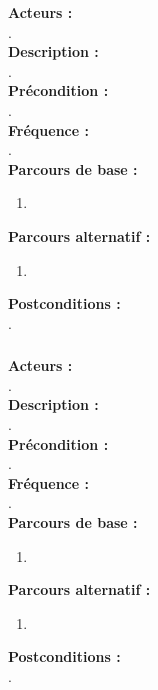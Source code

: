 \documentclass[../rapport.tex]{subfiles}
\begin{document}
\textbf{Acteurs :} \\
. \\

\textbf{Description :} \\
. \\

\textbf{Précondition :} \\
. \\

\textbf{Fréquence :} \\
. \\

\textbf{Parcours de base :} \\
\begin{enumerate}
    \item 
\end{enumerate}
\bigskip

\textbf{Parcours alternatif :}
\begin{enumerate}
    \item 
\end{enumerate}

\textbf{Postconditions :} \\
. \\



\subsubsection{}

\textbf{Acteurs :} \\
. \\

\textbf{Description :} \\
. \\

\textbf{Précondition :} \\
. \\

\textbf{Fréquence :} \\
. \\

\textbf{Parcours de base :} \\
\begin{enumerate}
    \item 
\end{enumerate}
\bigskip

\textbf{Parcours alternatif :}
\begin{enumerate}
    \item 
\end{enumerate}

\textbf{Postconditions :} \\
. \\

\newpage
\end{document}
